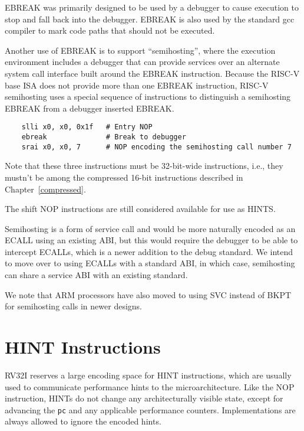 \begin{commentary}
  EBREAK was primarily designed to be used by a debugger to cause
  execution to stop and fall back into the debugger. EBREAK is also
  used by the standard gcc compiler to mark code paths that should not
  be executed.

  Another use of EBREAK is to support ``semihosting'', where the
  execution environment includes a debugger that can provide services
  over an alternate system call interface built around the EBREAK
  instruction.  Because the RISC-V base ISA does not provide more than
  one EBREAK instruction, RISC-V semihosting uses a special sequence of
  instructions to distinguish a semihosting EBREAK from a debugger
  inserted EBREAK.
\begin{verbatim}
    slli x0, x0, 0x1f   # Entry NOP
    ebreak              # Break to debugger
    srai x0, x0, 7      # NOP encoding the semihosting call number 7
\end{verbatim}
   Note that these three instructions must be 32-bit-wide instructions,
   i.e., they mustn't be among the compressed 16-bit instructions
   described in Chapter~\ref{compressed}.

   The shift NOP instructions are still considered available for use as
   HINTS.

   Semihosting is a form of service call and would be more naturally
   encoded as an ECALL using an existing ABI, but this would require
   the debugger to be able to intercept ECALLs, which is a newer
   addition to the debug standard.  We intend to move over to using
   ECALLs with a standard ABI, in which case, semihosting can share a
   service ABI with an existing standard.

   We note that ARM processors have also moved to using SVC instead of
   BKPT for semihosting calls in newer designs.
\end{commentary}

\section{HINT Instructions}
\label{sec:rv32i-hints}

RV32I reserves a large encoding space for HINT instructions, which are
usually used to communicate performance hints to the
microarchitecture.
Like the NOP instruction, HINTs do not change any architecturally visible
state, except for advancing the {\tt pc} and any applicable performance
counters.
Implementations are always allowed to ignore the encoded hints.

